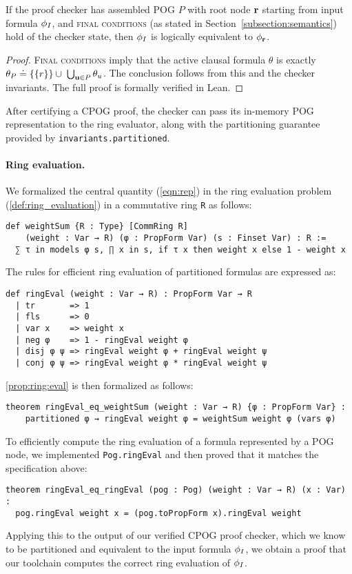\begin{thm}
\label{thm:lean:equiv}
If the proof checker has assembled POG $P$ with root node $\mathbf{r}$ starting from input formula $\phi_I$, and \textsc{final conditions} (as stated in Section~\ref{subsection:semantics}) hold of the checker state, then $\phi_I$ is logically equivalent to $\phi_{\mathbf{r}}$.
\end{thm}
\begin{proof}
\textsc{Final conditions} imply that the active clausal formula $\theta$ is exactly $\theta_P \doteq \{\{r\}\} \cup \; \bigcup_{\mathbf{u} \in P} \theta_{u}$. The conclusion follows from this and the checker invariants. The full proof is formally verified in Lean.
\end{proof}
After certifying a CPOG proof, the checker can pass its in-memory POG representation to the ring evaluator, along with the partitioning guarantee provided by \texttt{invariants.partitioned}.

\paragraph{Ring evaluation.} We formalized the central quantity (\ref{eqn:rep}) in the ring evaluation problem
(\ref{def:ring_evaluation}) in a commutative ring \lstinline{R} as follows:
\begin{lstlisting}
def weightSum {R : Type} [CommRing R]
    (weight : Var → R) (φ : PropForm Var) (s : Finset Var) : R :=
  ∑ τ in models φ s, ∏ x in s, if τ x then weight x else 1 - weight x
\end{lstlisting}
The rules for efficient ring evaluation of partitioned formulas are expressed as:
\begin{lstlisting}
def ringEval (weight : Var → R) : PropForm Var → R
  | tr       => 1
  | fls      => 0
  | var x    => weight x
  | neg φ    => 1 - ringEval weight φ
  | disj φ ψ => ringEval weight φ + ringEval weight ψ
  | conj φ ψ => ringEval weight φ * ringEval weight ψ
\end{lstlisting}
\ref{prop:ring:eval} is then formalized as follows:
\begin{lstlisting}
theorem ringEval_eq_weightSum (weight : Var → R) {φ : PropForm Var} :
    partitioned φ → ringEval weight φ = weightSum weight φ (vars φ)
\end{lstlisting}
To efficiently compute the ring evaluation of a formula represented by a POG node, we implemented
\lstinline{Pog.ringEval} and then proved that it matches the specification above:
\begin{lstlisting}
theorem ringEval_eq_ringEval (pog : Pog) (weight : Var → R) (x : Var) :
  pog.ringEval weight x = (pog.toPropForm x).ringEval weight
\end{lstlisting}
Applying this to the output of our verified CPOG proof checker, which we know to be partitioned
and equivalent to the input formula $\phi_I$, we obtain a proof that our toolchain computes
the correct ring evaluation of $\phi_I$.

